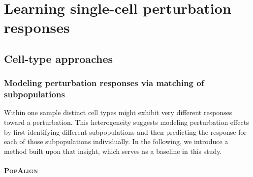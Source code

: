 \section{Learning single-cell perturbation responses}

\subsection{Cell-type approaches}  %
\subsubsection{Modeling perturbation responses via matching of subpopulations}
Within one sample distinct cell types might exhibit very different responses toward a perturbation. This heterogeneity suggests modeling perturbation effects by first identifying different subpopulations and then predicting the response for each of those subpopulations individually. In the following, we introduce a method built upon that insight, which serves as a baseline in this study.

\paragraph{\textsc{PopAlign}}


